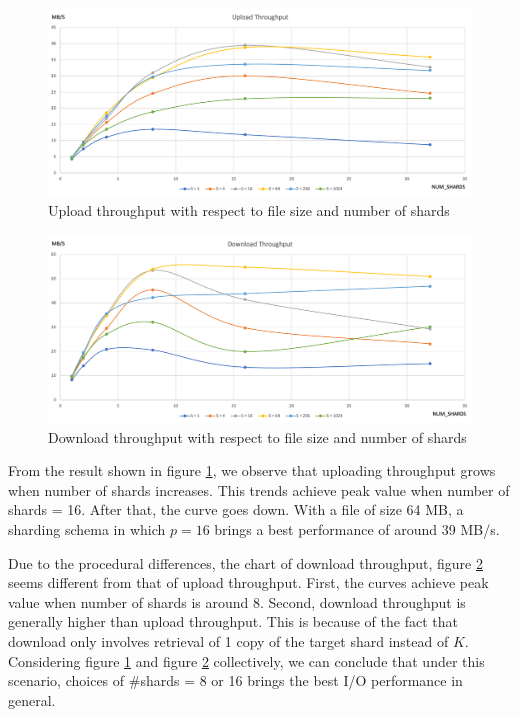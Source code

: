 \begin{figure}[hbt]
\centering
  \includegraphics[width=14cm]{charts/chart_upload_throughput.png}
  \caption{Upload throughput with respect to file size and number of shards}
  \label{fig:uploadthroughput}
\end{figure}

\begin{figure}[hbt]
\centering
  \includegraphics[width=14cm]{charts/chart_download_throughput.png}
  \caption{Download throughput with respect to file size and number of shards}
  \label{fig:downloadthroughput}
\end{figure}

From the result shown in figure \ref{fig:uploadthroughput}, we observe that uploading throughput grows when number of shards increases. This trends achieve peak value when number of shards = 16. After that, the curve goes down. With a file of size 64 MB, a sharding schema in which $p=16$ brings a best performance of around 39 MB/s.

Due to the procedural differences, the chart of download throughput, figure \ref{fig:downloadthroughput} seems different from that of upload throughput. First, the curves achieve peak value when number of shards is around 8. Second, download throughput is generally higher than upload throughput. This is because of the fact that download only involves retrieval of 1 copy of the target shard instead of $K$. Considering figure \ref{fig:uploadthroughput} and figure \ref{fig:downloadthroughput} collectively, we can conclude that under this scenario, choices of \#shards = 8 or 16 brings the best I/O performance in general.

